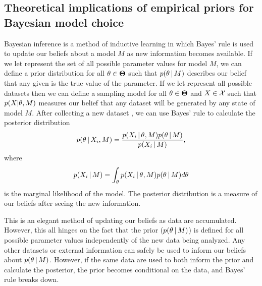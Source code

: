 \subsection*{Theoretical implications of empirical priors for Bayesian model
choice}
\begin{linenomath}
Bayesian inference is a method of inductive learning in which Bayes' rule is
used to update our beliefs about a model $M$ as new information becomes
available.
If we let \allParameterValues represent the set of all possible parameter
values for model $M$, we can define a prior distribution for all $\theta \in
\boldsymbol{\Theta}$ such that $p(\theta \,|\, M)$ describes our belief that
any given \myTheta{} is the true value of the parameter.
If we let \allDatasets represent all possible datasets then we can 
define a sampling model for all $\theta \in
\boldsymbol{\Theta}$ and $\alignment{}{} \in \allDatasets$ such that
$p(\alignment{}{} | \theta, M)$ measures our belief that any dataset \alignment{}{}
will be generated by any state \myTheta{} of model $M$.
After collecting a new dataset , we can use Bayes' rule to
calculate the posterior distribution
\begin{equation}
    p(\myTheta{} \given \alignment{i}{}, M) = \frac{p(\alignment{i}{} \given
    \myTheta{}, M)p(\myTheta{} \given M)}{p(\alignment{i}{} \given M)},
    \label{eq:bayesrule}
\end{equation}
where
\begin{equation}
    p(\alignment{i}{} \given M) = \int_{\myTheta{}} p(\alignment{i}{} \given
    \myTheta{}, M)p(\myTheta{} \given M) d\myTheta{}
    \label{eq:marginallikelhiood}
\end{equation}
is the marginal likelihood of the model.
The posterior distribution is a measure of our beliefs after seeing the new
information.
\end{linenomath}

This is an elegant method of updating our beliefs as data are accumulated.
However, this all hinges on the fact that the prior ($p(\theta_{} \,|\, M)$)
is defined for all possible parameter values independently of the new data
being analyzed.
Any other datasets or external information can safely be used to inform our
beliefs about $p(\theta_{} \,|\, M)$.
However, if the same data are used to both inform the prior and calculate the
posterior, the prior becomes conditional on the data, and Bayes' rule breaks
down.

